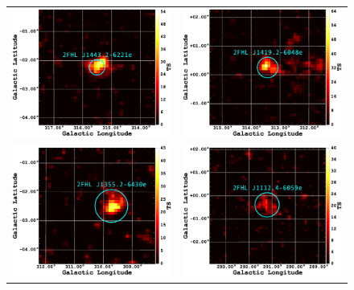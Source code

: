 \begin{figure}[ht]
    \begin{center}
         \hspace*{-1.5cm}\begin{tabular}{ll}
            \includegraphics[width=8cm]{Figures/l315_b0_ES_3_residTSmap_2FHL_zoom.eps} &
            \includegraphics[width=8cm]{Figures/l315_b0_ES_4_residTSmap_2FHL_zoom.eps}\\
            \includegraphics[width=8cm]{Figures/l315_b0_ES_1_residTSmap_2FHL_zoom.eps} &
            \includegraphics[width=8cm]{Figures/l290_b0_ES_1_residTSmap_2FHL_zoom.eps} \\

\end{tabular}
\end{center}
\end{figure}
